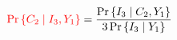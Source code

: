 \begin{frame}{}
  \begin{align*}
    \textcolor{red}{\Pr\left\{C_2 \mid I_3, Y_1\right\}} = \frac{\Pr{\left\{I_3 \mid C_2, Y_1\right\}}}{3 \Pr\left\{I_3 \mid Y_1\right\}}
  \end{align*}
\end{frame}

\begin{frame}{}
\end{frame}

\begin{frame}{}
\end{frame}
